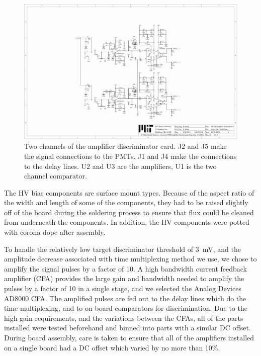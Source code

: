 \documentclass[review,number,sort&compress]{elsarticle}
\begin{document}
\begin{figure}[ht]
\begin{center}
\includegraphics[width=5.5in, keepaspectratio=true, trim=4.54in 2.12in 4.54in 2.12in, clip=true]{graphics/veto_sch.pdf}
\caption{Two channels of the amplifier discriminator card. J2 and J5 make the signal connections to the PMTs. J1 and J4 make the connections to the delay lines. U2 and U3 are the amplifiers, U1 is the two channel comparator.
\label{fig:ampdiscsch}}
\end{center}
\end{figure}

The HV bias components are surface mount types. Because of the aspect
ratio of the width and length of some of the components, they had to
be raised slightly off of the board during the soldering process to
ensure that flux could be cleaned from underneath the components. In
addition, the HV components were potted with corona dope after
assembly.

To handle the relatively low target discriminator threshold of 3~mV,
and the amplitude decrease associated with time multiplexing method we
use, we chose to amplify the signal pulses by a factor of 10.  A high
bandwidth current feedback amplifier (CFA) provides the large gain and
bandwidth needed to amplify the pulses by a factor of 10 in a single
stage, and we selected the Analog Devices AD8000 CFA. The amplified
pulses are fed out to the delay lines which do the time-multiplexing,
and to on-board comparators for discrimination.  Due to the high gain
requirements, and the variations between the CFAs, all of the parts
installed were tested beforehand and binned into parts with a similar
DC offset.  During board assembly, care is taken to ensure that all
of the amplifiers installed on a single board had a DC offset which
varied by no more than 10\%.
\end{document}
